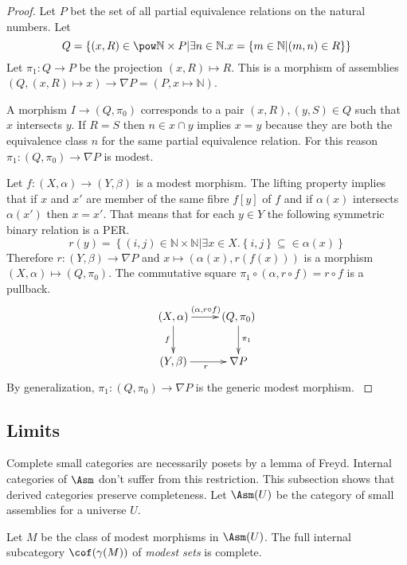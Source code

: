 \documentclass{tac}
\newcommand\set[1]{\left\{#1\right\}}
\newcommand\N{\mathbb N}
\newcommand\of{:}
\newcommand\gen\gamma
\begin{document}
\begin{proof} Let $P$ bet the set of all partial equivalence relations on the natural numbers. Let
\[Q=\set{(x,R)\in\pow\N\times P| \exists n\in \N. x = \set{ m\in \N | (m,n)\in R}}\]
Let $\pi_1\of Q\to P$ be the projection $(x,R) \mapsto R$. This is a morphism of assemblies $(Q,(x,R)\mapsto x) \to \nabla P=(P, x\mapsto \N)$.

A morphism $I\to(Q,\pi_0)$ corresponds to a pair $(x,R),(y,S)\in Q$ such that $x$ intersects $y$. If $R=S$ then $n\in x\cap y$ implies $x=y$ because they are both the equivalence class $n$ for the same partial equivalence relation. For this reason $\pi_1\of (Q,\pi_0)\to\nabla P$ is modest.

Let $f\of(X,\alpha)\to(Y,\beta)$ is a modest morphism. The lifting property implies that if $x$ and $x'$ are member of the same fibre $f[y]$ of $f$ and if $\alpha(x)$ intersects $\alpha(x')$ then $x=x'$. That means that for each $y\in Y$ the following symmetric binary relation is a PER. \[r(y) = \set{(i,j)\in \N\times\N| \exists x\in X. \set{i,j}\subseteq \in \alpha(x)}\] Therefore $r\of(Y,\beta)\to \nabla P$ and $x\mapsto (\alpha(x),r(f(x)))$ is a morphism $(X,\alpha)\mapsto(Q,\pi_0)$. The commutative square $\pi_1\circ (\alpha,r\circ f) = r\circ f$ is a pullback.
\[\xymatrix{
(X,\alpha)\ar[d]_f\ar[r]^{(\alpha,r\circ f)} & (Q,\pi_0)\ar[d]^{\pi_1}\\
(Y,\beta) \ar[r]_{r} & \nabla P
}\]
By generalization, $\pi_1\of (Q,\pi_0)\to\nabla P$ is the generic modest morphism. \label{generic modest}
\end{proof}

\subsection{Limits}
Complete small categories are necessarily posets by a lemma of Freyd. Internal categories of $\Asm$ don't suffer from this restriction. This subsection shows that derived categories preserve completeness. Let $\Asm(U)$ be the category of small assemblies for a universe $U$.

\begin{proposition} Let $M$ be the class of modest morphisms in $\Asm(U)$. The full internal subcategory $\cof(\gen(M))$ of \emph{modest sets} is complete. \end{proposition}
\end{document}
